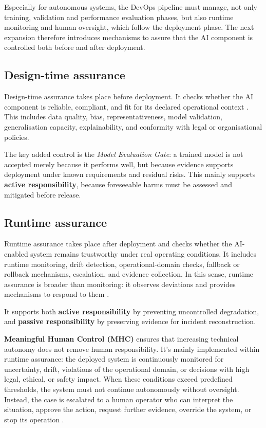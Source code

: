 \documentclass[11pt,a4paper]{article}
\begin{document}
Especially for autonomous systems, the DevOps pipeline must manage, not only training, validation and performance evaluation phases, but also runtime monitoring and human oversight, which follow the deployment phase. The next expansion therefore introduces mechanisms to assure that the AI component is controlled both before and after deployment.

\subsection{Design-time assurance}

Design-time assurance takes place before deployment. It checks whether the AI component is reliable, compliant, and fit for its declared operational context \cite[Secs.~8.4.2]{taid_whitepaper}. This includes data quality, bias, representativeness, model validation, generalisation capacity, explainability, and conformity with legal or organisational policies.

The key added control is the \textit{Model Evaluation Gate}: a trained model is not accepted merely because it performs well, but because evidence supports deployment under known requirements and residual risks. This mainly supports \textbf{active responsibility}, because foreseeable harms must be assessed and mitigated before release.

\subsection{Runtime assurance}

Runtime assurance takes place after deployment and checks whether the AI-enabled system remains trustworthy under real operating conditions. It includes runtime monitoring, drift detection, operational-domain checks, fallback or rollback mechanisms, escalation, and evidence collection. In this sense, runtime assurance is broader than monitoring: it observes deviations and provides mechanisms to respond to them \cite[Secs.~8.4.2.2 and~9.2.3]{taid_whitepaper}.

It supports both \textbf{active responsibility} by preventing uncontrolled degradation, and \textbf{passive responsibility} by preserving evidence for incident reconstruction.

\textbf{Meaningful Human Control (MHC)} ensures that increasing technical autonomy does not remove human responsibility. It's mainly implemented within runtime assurance: the deployed system is continuously monitored for uncertainty, drift, violations of the operational domain, or decisions with high legal, ethical, or safety impact. When these conditions exceed predefined thresholds, the system must not continue autonomously without oversight. Instead, the case is escalated to a human operator who can interpret the situation, approve the action, request further evidence, override the system, or stop its operation \cite[Secs.~6.3, ~7.1 and~8.5.2]{taid_whitepaper}.
\end{document}
